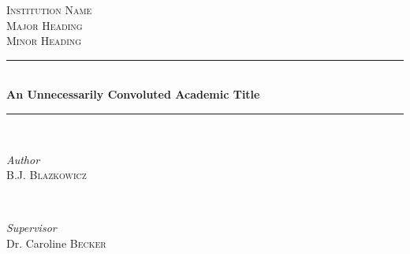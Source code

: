 
%
%
%
% 


	\newcommand{\HRule}{\rule{\linewidth}{0.5mm}} %
	
	\center %
	
	
	\textsc{\LARGE Institution Name}\\[1.5cm] %
	
	\textsc{\Large Major Heading}\\[0.5cm] %
	
	\textsc{\large Minor Heading}\\[0.5cm] %
	
	
	\HRule\\[0.4cm]
	
	{\huge\bfseries An Unnecessarily Convoluted Academic Title}\\[0.4cm] %
	
	\HRule\\[1.5cm]
	
	
	\begin{minipage}{0.4\textwidth}
		\begin{flushleft}
			\large
			\textit{Author}\\
			B.J. \textsc{Blazkowicz} %
		\end{flushleft}
	\end{minipage}
	~
	\begin{minipage}{0.4\textwidth}
		\begin{flushright}
			\large
			\textit{Supervisor}\\
			Dr. Caroline \textsc{Becker} %
		\end{flushright}
	\end{minipage}
	
